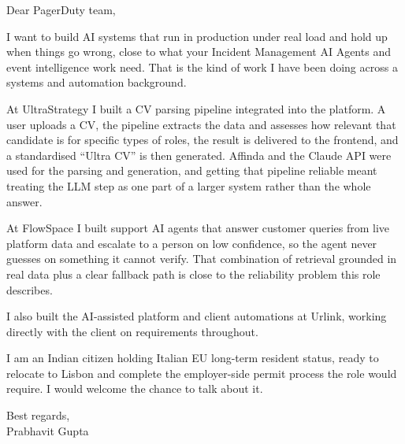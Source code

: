 \documentclass[a4paper,11pt]{article}
\begin{document}
Dear PagerDuty team,

I want to build AI systems that run in production under real load and hold up when things go wrong, close to what your Incident Management AI Agents and event intelligence work need. That is the kind of work I have been doing across a systems and automation background.

At UltraStrategy I built a CV parsing pipeline integrated into the platform. A user uploads a CV, the pipeline extracts the data and assesses how relevant that candidate is for specific types of roles, the result is delivered to the frontend, and a standardised ``Ultra CV'' is then generated. Affinda and the Claude API were used for the parsing and generation, and getting that pipeline reliable meant treating the LLM step as one part of a larger system rather than the whole answer.

At FlowSpace I built support AI agents that answer customer queries from live platform data and escalate to a person on low confidence, so the agent never guesses on something it cannot verify. That combination of retrieval grounded in real data plus a clear fallback path is close to the reliability problem this role describes.

I also built the AI-assisted platform and client automations at Urlink, working directly with the client on requirements throughout.

I am an Indian citizen holding Italian EU long-term resident status, ready to relocate to Lisbon and complete the employer-side permit process the role would require. I would welcome the chance to talk about it.

Best regards,\\
Prabhavit Gupta
\end{document}
